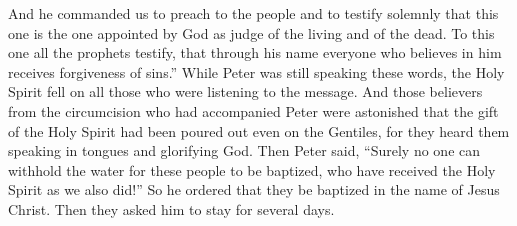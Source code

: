 \begin{biblechapter}
\verse And he commanded us to preach to the people and to testify solemnly that this one is the one appointed by God as judge of the living and of the dead.
\verse To this one all the prophets testify, that through his name everyone who believes in him receives forgiveness of sins.”
 While Peter was still speaking these words, the Holy Spirit fell on all those who were listening to the message.
\verse And those believers from the circumcision who had accompanied Peter were astonished that the gift of the Holy Spirit had been poured out even on the Gentiles,
\verse for they heard them speaking in tongues and glorifying God. Then Peter said,
\verse “Surely no one can withhold the water for these people to be baptized, who have received the Holy Spirit as we also did!”
\verse So he ordered that they be baptized in the name of Jesus Christ. Then they asked him to stay for several days.
\end{biblechapter}

